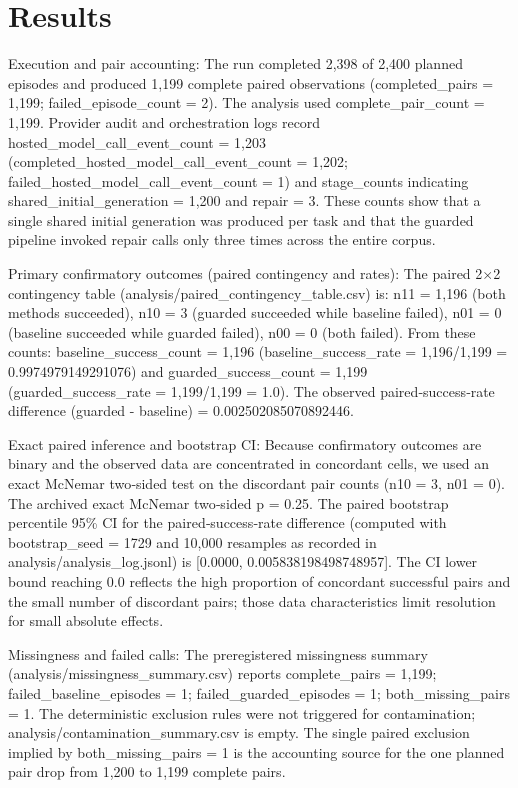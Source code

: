 \documentclass[conference]{IEEEtran}
\begin{document}
\section{Results}
Execution and pair accounting: The run completed 2,398 of 2,400 planned episodes and produced 1,199 complete paired observations (completed\_pairs = 1,199; failed\_episode\_count = 2). The analysis used complete\_pair\_count = 1,199. Provider audit and orchestration logs record hosted\_model\_call\_event\_count = 1,203 (completed\_hosted\_model\_call\_event\_count = 1,202; failed\_hosted\_model\_call\_event\_count = 1) and stage\_counts indicating shared\_initial\_generation = 1,200 and repair = 3. These counts show that a single shared initial generation was produced per task and that the guarded pipeline invoked repair calls only three times across the entire corpus.

Primary confirmatory outcomes (paired contingency and rates): The paired 2\ensuremath{\times}2 contingency table (analysis/paired\_contingency\_table.csv) is: n11 = 1,196 (both methods succeeded), n10 = 3 (guarded succeeded while baseline failed), n01 = 0 (baseline succeeded while guarded failed), n00 = 0 (both failed). From these counts: baseline\_success\_count = 1,196 (baseline\_success\_rate = 1,196/1,199 = 0.9974979149291076) and guarded\_success\_count = 1,199 (guarded\_success\_rate = 1,199/1,199 = 1.0). The observed paired‑success‑rate difference (guarded - baseline) = 0.002502085070892446.

Exact paired inference and bootstrap CI: Because confirmatory outcomes are binary and the observed data are concentrated in concordant cells, we used an exact McNemar two‑sided test on the discordant pair counts (n10 = 3, n01 = 0). The archived exact McNemar two‑sided p = 0.25. The paired bootstrap percentile 95\% CI for the paired‑success‑rate difference (computed with bootstrap\_seed = 1729 and 10,000 resamples as recorded in analysis/analysis\_log.jsonl) is [0.0000, 0.005838198498748957]. The CI lower bound reaching 0.0 reflects the high proportion of concordant successful pairs and the small number of discordant pairs; those data characteristics limit resolution for small absolute effects.

Missingness and failed calls: The preregistered missingness summary (analysis/missingness\_summary.csv) reports complete\_pairs = 1,199; failed\_baseline\_episodes = 1; failed\_guarded\_episodes = 1; both\_missing\_pairs = 1. The deterministic exclusion rules were not triggered for contamination; analysis/contamination\_summary.csv is empty. The single paired exclusion implied by both\_missing\_pairs = 1 is the accounting source for the one planned pair drop from 1,200 to 1,199 complete pairs.
\end{document}
